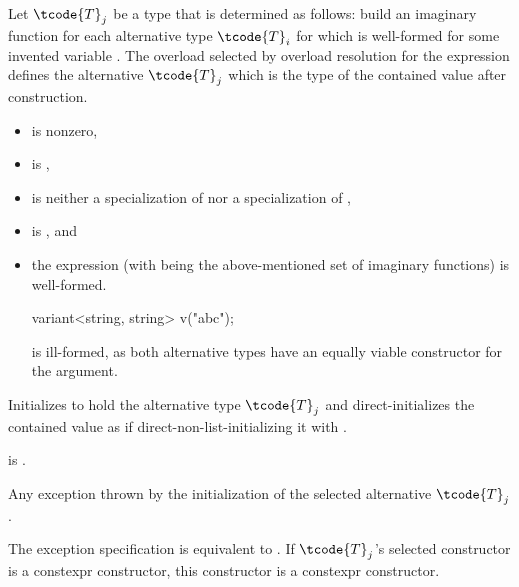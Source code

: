 \begin{itemdescr}
\pnum
Let $\tcode{T}_j$ be a type that is determined as follows:
build an imaginary function 
for each alternative type $\tcode{T}_i$
for which  
is well-formed for some invented variable .
The overload  selected by overload
resolution for the expression  defines
the alternative $\tcode{T}_j$ which is the type of the contained value after
construction.

\pnum
\constraints
\begin{itemize}
\item
{} is nonzero,

\item
{} is ,

\item
{} is neither
a specialization of  nor
a specialization of ,

\item
{} is , and

\item
the expression \brk{}
(with  being the above-mentioned set of
imaginary functions) is well-formed.
\begin{note}
\begin{codeblock}
variant<string, string> v("abc");
\end{codeblock}
is ill-formed, as both alternative types have an equally viable constructor
for the argument.
\end{note}
\end{itemize}

\pnum
\effects
Initializes  to hold the alternative type $\tcode{T}_j$ and
direct-initializes the contained value as if direct-non-list-initializing it
with .

\pnum
\ensures
{} is .

\pnum
\throws
Any exception thrown by the initialization of the selected alternative $\tcode{T}_j$.

\pnum
\remarks
The exception specification is equivalent to
.
If $\tcode{T}_j$'s selected constructor is a constexpr constructor,
this constructor is a constexpr constructor.
\end{itemdescr}

